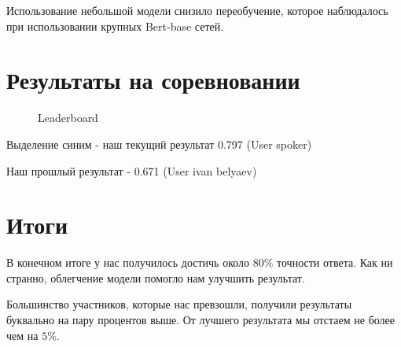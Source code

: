 \documentclass[12pt]{article}
\newcommand{\imgh}[3]
{
\begin{figure}[H]
\center{\texttt{[image: \#2]}}
\caption{#3}
\label{ris:#2}
\end{figure}
}
\begin{document}
Использование небольшой модели снизило переобучение, которое наблюдалось при использовании крупных Bert-base сетей.

\newpage

\section{Результаты на соревновании}

\imgh{17cm}{leaderboard-2.png}{Leaderboard}

Выделение синим - наш текущий результат 0.797 (User spoker)

Наш прошлый результат - 0.671 (User ivan belyaev)

\newpage

\section{Итоги}

В конечном итоге у нас получилось достичь около 80$\%$ точности ответа. Как ни странно, облегчение модели помогло нам улучшить результат. 

Большинство участников, которые нас превзошли, получили результаты буквально на пару процентов выше. От лучшего результата мы отстаем не более чем на $5\%$.
\end{document}
